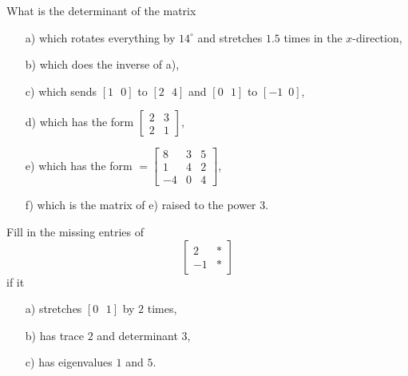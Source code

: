 \medskip 

\begin{problem}
    What is the determinant of the matrix
    
    \begin{enumerate}
    \item[a) ] which rotates everything by $14^\circ$ and stretches $1.5$ times in the $x$-direction,

 \item[b) ] which does the inverse of a),

 \item[c) ] which sends $[1 \,\,\,\,0]$ to $[2 \,\,\,\,4]$ and $[0\,\,\,\,1]$ to $[-1\,\,\,0]$,

 \item[d) ] which has the form $\begin{bmatrix}
     2 & 3 \\ 2 &1
 \end{bmatrix}$,
 
        \item[e) ] which has the form  $=\begin{bmatrix}
        8&3&5\\1&4&2\\-4&0&4   \end{bmatrix}$,

        \item[f) ] which is the matrix of e) raised to the power $3$.
    \end{enumerate}
\end{problem}
\medskip


\begin{problem}
Fill in the missing entries of 
\[
\begin{bmatrix}
    2 & * \\ -1 & *
\end{bmatrix}
\]
if it
    \begin{enumerate}
        \item[a) ] stretches $[0 \,\,\,\,1]$ by $2$ times,
        
        \item[b) ] has trace $2$ and determinant $3$,
        
        \item[c) ] has eigenvalues $1$ and $5$.
    \end{enumerate}

\end{problem}
\medskip

